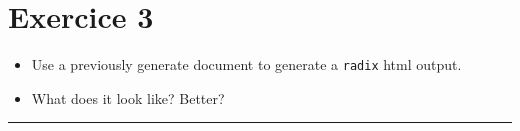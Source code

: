 \documentclass[]{article}
\begin{document}
\hypertarget{exercice-3}{%
\section{Exercice 3}\label{exercice-3}}

\begin{itemize}
\item
  Use a previously generate document to generate a \texttt{radix} html
  output.
\item
  What does it look like? Better?
\end{itemize}

\begin{center}\rule{0.5\linewidth}{\linethickness}\end{center}
\end{document}

